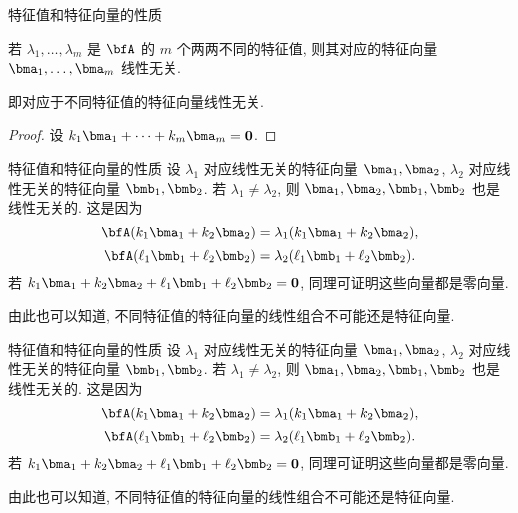\begin{frame}{特征值和特征向量的性质}
\beqskip{0pt}
	\onslide<+->
	\begin{theorem}
		若 $\lambda_1,\dots,\lambda_m$ 是 $\bfA$ 的 $m$ 个两两不同的特征值, 则其对应的特征向量 $\bma_1,\dots,\bma_m$ 线性无关.
	\end{theorem}
	\onslide<+->
	即\alert{对应于不同特征值的特征向量线性无关}.
	\onslide<+->
	\begin{proof}
		设 $k_1\bma_1+\cdots+k_m\bma_m={\bf0}$.
		\onslide<+->{%
			从而
			\[(k_1\bma_1,\cdots,k_m\bma_m)=\bfO,\qquad
			k_1=\cdots=k_m=0.\qedhere\]
		}
		\vspace{-\baselineskip}
	\end{proof}
\endgroup
\end{frame}


\begin{frame}{特征值和特征向量的性质}
	\onslide<+->
	设 $\lambda_1$ 对应线性无关的特征向量 $\bma_1,\bma_2$,
	$\lambda_2$ 对应线性无关的特征向量 $\bmb_1,\bmb_2$.
	\onslide<+->
	若 $\lambda_1\neq \lambda_2$, 则 $\bma_1,\bma_2,\bmb_1,\bmb_2$ 也是线性无关的.
	\onslide<+->
	这是因为
	\[\bfA(k_1\bma_1+k_2\bma_2)=\lambda_1(k_1\bma_1+k_2\bma_2),\]
	\[\bfA(\ell_1\bmb_1+\ell_2\bmb_2)=\lambda_2(\ell_1\bmb_1+\ell_2\bmb_2).\]
	\onslide<+->
	若 $k_1\bma_1+k_2\bma_2+\ell_1\bmb_1+\ell_2\bmb_2={\bf0}$,
	同理可证明这些向量都是零向量.
	
	\onslide<+->
	由此也可以知道, 不同特征值的特征向量的线性组合不可能还是特征向量.
\end{frame}


\begin{frame}{特征值和特征向量的性质}
	\onslide<+->
	设 $\lambda_1$ 对应线性无关的特征向量 $\bma_1,\bma_2$,
	$\lambda_2$ 对应线性无关的特征向量 $\bmb_1,\bmb_2$.
	\onslide<+->
	若 $\lambda_1\neq \lambda_2$, 则 $\bma_1,\bma_2,\bmb_1,\bmb_2$ 也是线性无关的.
	\onslide<+->
	这是因为
	\[\bfA(k_1\bma_1+k_2\bma_2)=\lambda_1(k_1\bma_1+k_2\bma_2),\]
	\[\bfA(\ell_1\bmb_1+\ell_2\bmb_2)=\lambda_2(\ell_1\bmb_1+\ell_2\bmb_2).\]
	\onslide<+->
	若 $k_1\bma_1+k_2\bma_2+\ell_1\bmb_1+\ell_2\bmb_2={\bf0}$,
	同理可证明这些向量都是零向量.
	
	\onslide<+->
	由此也可以知道, 不同特征值的特征向量的线性组合不可能还是特征向量.
\end{frame}





